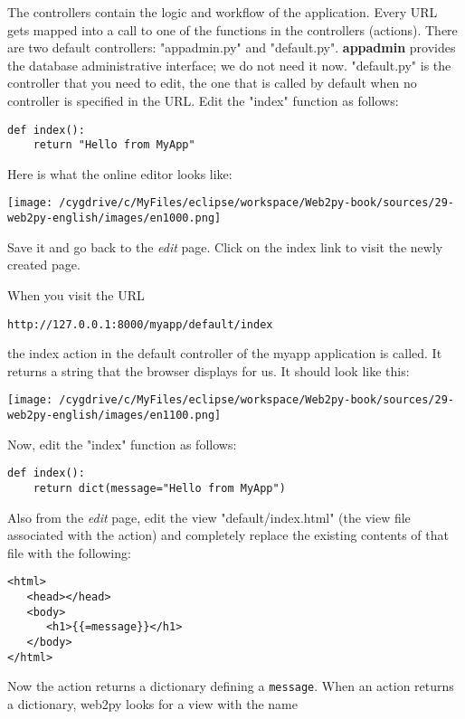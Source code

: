 \documentclass[justified,sixbynine,notoc]{tufte-book}
\def\ft{\small\tt}
\begin{document}
\begin{fullwidth}
The controllers contain the logic and workflow of the application. Every URL gets mapped into a call to one of the functions in the controllers (actions). There are two default controllers: "appadmin.py" and "default.py". {\bf appadmin} provides the database administrative interface; we do not need it now. "default.py" is the controller that you need to edit, the one that is called by default when no controller is specified in the URL. Edit the "index" function as follows:
\begin{lstlisting}
def index():
    return "Hello from MyApp"
\end{lstlisting}

Here is what the online editor looks like:


\goodbreak\begin{center}\texttt{[image: /cygdrive/c/MyFiles/eclipse/workspace/Web2py-book/sources/29-web2py-english/images/en1000.png]}\end{center}


Save it and go back to the {\it edit} page. Click on the index link to visit the newly created page.

When you visit the URL
\begin{lstlisting}[keywords={}]
http://127.0.0.1:8000/myapp/default/index
\end{lstlisting}
\noindent the index action in the default controller of the myapp application is called. It returns a string that the browser displays for us. It should look like this:


\goodbreak\begin{center}\texttt{[image: /cygdrive/c/MyFiles/eclipse/workspace/Web2py-book/sources/29-web2py-english/images/en1100.png]}\end{center}


Now, edit the "index" function as follows:
\begin{lstlisting}
def index():
    return dict(message="Hello from MyApp")
\end{lstlisting}

Also from the {\it edit} page, edit the view "default/index.html" (the view file associated with the action) and completely replace the existing contents of that file with the following:
\begin{lstlisting}[keywords={}]
<html>
   <head></head>
   <body>
      <h1>{{=message}}</h1>
   </body>
</html>
\end{lstlisting}

Now the action returns a dictionary defining a {\ft message}. When an action returns a dictionary, web2py looks for a view with the name


\end{fullwidth}
\end{document}
